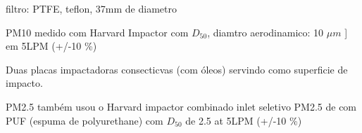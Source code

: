 filtro: PTFE, teflon, 37mm de diametro

PM10 medido com Harvard Impactor com $D_50$, diamtro aerodinamico: 10 $\mu m$  ]
em 5LPM (+/-10 \%) 

Duas placas impactadoras consecticvas (com óleos) servindo como superficie de 
impacto.

PM2.5 também usou o Harvard impactor combinado inlet seletivo PM2.5 de com 
PUF (espuma de polyurethane) com $D_50$ de 2.5 at 5LPM (+/-10 \%)


